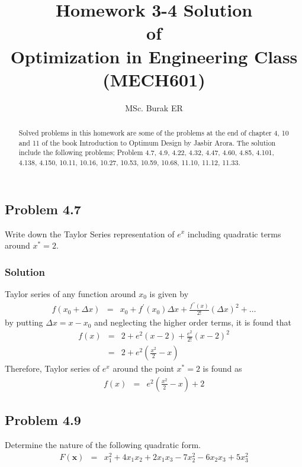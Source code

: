 \documentclass[]{report}
\title{ Homework 3-4 Solution \\ \centering of \\ \centering Optimization in Engineering Class\\ \centering (MECH601)}
\author{MSc. Burak ER}
\begin{document}
\maketitle

\begin{abstract}
Solved problems in this homework are some of the problems at the end of chapter 4, 10 and 11 of the book Introduction to Optimum Design by Jasbir Arora\cite{arora2004introduction}. The solution include the following problems; Problem 4.7, 4.9, 4.22, 4.32, 4.47, 4.60, 4.85, 4.101, 4.138, 4.150, 10.11, 10.16, 10.27, 10.53, 10.59, 10.68, 11.10, 11.12, 11.33.
\end{abstract}
\subsection*{Problem 4.7}
Write down the Taylor Series representation of $e^x$ including quadratic terms around $x^*=2$.
\subsubsection*{Solution}
Taylor series of any function around $x_0$ is given by
\begin{eqnarray}
f\left(x_0+\Delta x\right)&=&x_0+f^\prime\left(x_0\right)\Delta x+\frac{f^{\prime \prime}\left(x\right)}{2!}\left(\Delta x\right)^2+\dots
\end{eqnarray}
by putting $\Delta x=x-x_0$ and neglecting the higher order terms, it is found that
\begin{eqnarray*}
f\left(x\right)&=&2+e^2\left(x-2\right)+\frac{e^2}{2!}\left(x-2\right)^2 \\
&=&2+e^2\left(\frac{x^2}{2}-x\right)
\end{eqnarray*}
Therefore, Taylor series of $e^x$ around the point $x^*=2$ is found as
\begin{eqnarray*}
f\left(x\right)&=& e^2\left(\frac{x^2}{2}-x\right)+2
\end{eqnarray*}
\subsection*{Problem 4.9}
Determine the nature of the following quadratic form.
\begin{eqnarray}
F\left(\mathbf{x}\right)&=&x_1^2+4x_1x_2+2x_1x_3-7x_2^2-6x_2x_3+5x_3^2
\label{eqproblem:4.9}
\end{eqnarray}
\end{document}
